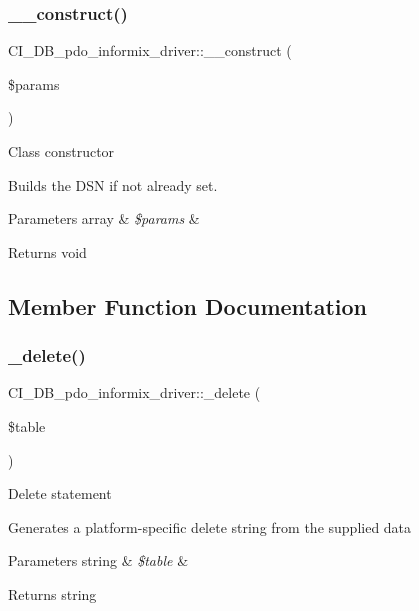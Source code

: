 \subsubsection{\texorpdfstring{\+\_\+\+\_\+construct()}{\_\_construct()}}
{\footnotesize\ttfamily C\+I\+\_\+\+D\+B\+\_\+pdo\+\_\+informix\+\_\+driver\+::\+\_\+\+\_\+construct (\begin{DoxyParamCaption}\item[{}]{\$params }\end{DoxyParamCaption})}

Class constructor

Builds the D\+SN if not already set.


\begin{DoxyParams}[1]{Parameters}
array & {\em \$params} & \\
\hline
\end{DoxyParams}
\begin{DoxyReturn}{Returns}
void 
\end{DoxyReturn}


\subsection{Member Function Documentation}
\mbox{\label{class_c_i___d_b__pdo__informix__driver_abc5569e1a497b1f056cc01aa216780b5}} 
\subsubsection{\texorpdfstring{\+\_\+delete()}{\_delete()}}
{\footnotesize\ttfamily C\+I\+\_\+\+D\+B\+\_\+pdo\+\_\+informix\+\_\+driver\+::\+\_\+delete (\begin{DoxyParamCaption}\item[{}]{\$table }\end{DoxyParamCaption})\hspace{0.3cm}{\ttfamily [protected]}}

Delete statement

Generates a platform-\/specific delete string from the supplied data


\begin{DoxyParams}[1]{Parameters}
string & {\em \$table} & \\
\hline
\end{DoxyParams}
\begin{DoxyReturn}{Returns}
string 
\end{DoxyReturn}
\mbox{\label{class_c_i___d_b__pdo__informix__driver_aa84b07a0a8e72cd95c514f6cde1f96d3}} 
